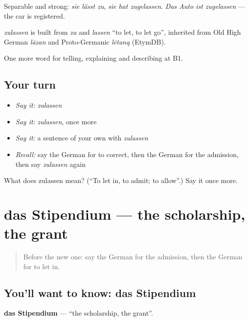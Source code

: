Separable and strong: \emph{sie lässt zu}, \emph{sie hat zugelassen}. \emph{Das Auto ist zugelassen} — the car is registered.

\begin{cousinweb}
\emph{zulassen} is built from \emph{zu} and \emph{lassen} \textquotedblleft{}to let, to let go\textquotedblright{}, inherited from Old High German \emph{lāzan} and Proto-Germanic \emph{lētaną} (EtymDB).
\end{cousinweb}

\begin{grammarlens}[title={What you've built}]
One more word for telling, explaining and describing at B1.
\end{grammarlens}

\subsection*{Your turn}
\begin{itemize}
\raggedright
  \item \emph{Say it:} \emph{zulassen}
  \item \emph{Say it:} \emph{zulassen}, once more
  \item \emph{Say it:} a sentence of your own with \emph{zulassen}
  \item \emph{Recall:} say the German for to correct, then the German for the admission, then say \emph{zulassen} again
\end{itemize}

\begin{tcolorbox}[breakable,colback=teal!4,colframe=teal!35!black,title={Before you move on}]
What does zulassen mean? (\textquotedblleft{}To let in, to admit; to allow\textquotedblright{}.) Say it once more.
\end{tcolorbox}
\section[das Stipendium]{das Stipendium — the scholarship, the grant}

\label{lesson:GE-C380-stipendium}



\begin{quote}
Before the new one: say the German for the admission, then the German for to let in.
\end{quote}

\subsection*{You'll want to know: das Stipendium}
\textbf{das Stipendium} — \textquotedblleft{}the scholarship, the grant\textquotedblright{}.

